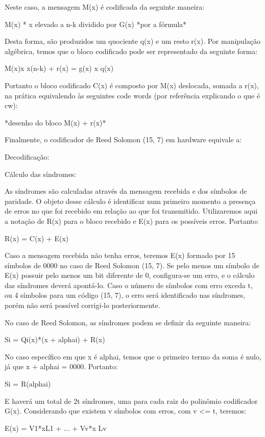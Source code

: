 	Neste caso, a mensagem M(x) é codificada da seguinte maneira:
	 
	M(x) * x elevado a n-k dividido por G(x)
	 *por a fórmula*
	 
	Desta forma, são produzidos um quociente q(x) e um resto r(x). Por manipulação algébrica, temos que o bloco codificado pode ser representado da seguinte forma:
	 
	M(x)x x(n-k) + r(x) = g(x) x q(x)
	 
	Portanto o bloco codificado C(x) é composto por M(x) deslocada, somada a r(x), na prática equivalendo às seguintes code words (por referência explicando o que é cw):
	 
	 *desenho do bloco M(x) + r(x)*
	 
	Finalmente, o codificador de Reed Solomon (15, 7) em hardware equivale a:
	 
	 
	Decodificação:
	
	Cálculo das síndromes:
	
	As síndromes são calculadas através da mensagem recebida e dos símbolos de paridade. O objeto desse cálculo é identificar num primeiro momento a presença de erros no que foi recebido em relação ao que foi transmitido. Utilizaremos aqui a notação de R(x) para o bloco recebido e E(x) para os possíveis erros. Portanto:
	
	R(x) = C(x) + E(x)
	
	Caso a mensagem recebida não tenha erros, teremos E(x) formado por 15 símbolos de 0000 no caso de Reed Solomon (15, 7). Se pelo menos um símbolo de E(x) possuir pelo menos um bit diferente de 0, configura-se um erro, e o cálculo das síndromes deverá apontá-lo. Caso o número de símbolos com erro exceda t, ou 4 símbolos para um código (15, 7), o erro será identificado nas síndromes, porém não será possível corrigi-lo posteriormente.
	
	No caso de Reed Solomon, as síndromes podem se definir da seguinte maneira:
	
	Si = Qi(x)*(x + alphai) + R(x)
	
	No caso específico em que x é alphai, temos que o primeiro termo da soma é nulo, já que x + alphai = 0000. Portanto:
	
	Si = R(alphai)
	
	E haverá um total de 2t síndromes, uma para cada raiz do polinômio codificador G(x). Considerando que existem v símbolos com erros, com v <= t, teremos:
	
	E(x) = V1*xL1 + ... + Vv*x Lv
	

